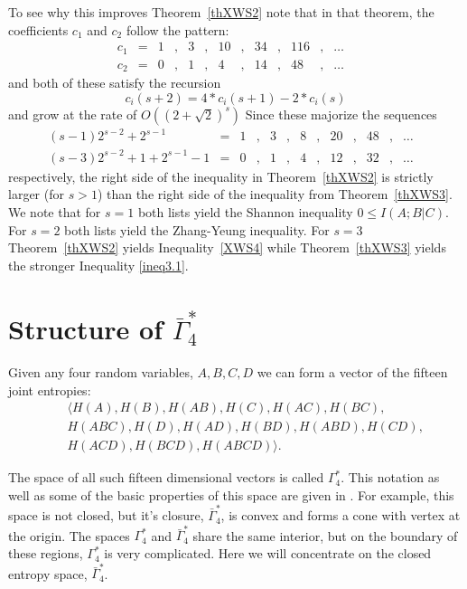 \documentclass[10pt,journal]{IEEEtran}
\begin{document}
To see why this improves Theorem~\ref{thXWS2} note that in that theorem, the coefficients
$c_1$ and $c_2$ follow the pattern:
\begin{align*}
&&c_1&=&1&,&3&,&10&,&34&,&116&,&\ldots&&&\\
&&c_2&=&0&,&1&,&4&,&14&,&48&,&\ldots&&&
\end{align*}
and both of these satisfy the recursion
\begin{equation*}
c_i(s+2) = 4*c_i(s+1) - 2*c_i(s)
\end{equation*}
and grow at the rate of $O((2+\sqrt2)^s)$
Since these majorize the sequences
\begin{align*}
(s-1)2^{s-2} + 2^{s-1}&=&1&,&3&,&8&,&20&,&48&,&\ldots&\\
(s-3)2^{s-2}+1 + 2^{s-1}-1&=&0&,&1&,&4&,&12&,&32&,&\ldots&
\end{align*}
respectively, the right side of the inequality in Theorem~\ref{thXWS2}
is strictly larger (for $s>1$) than the right side of the inequality from Theorem~\ref{thXWS3}.
We note that for $s=1$ both lists yield the Shannon inequality $0\leq I(A;B|C)$.
For $s=2$ both lists yield the Zhang-Yeung inequality.  For $s=3$ Theorem~\ref{thXWS2}
yields Inequality~\eqref{XWS4} while Theorem~\ref{thXWS3} yields the stronger Inequality \eqref{ineq3.1}.




\section{Structure of $\bar\Gamma^*_4$}\label{structure}

Given any four random variables, $A,B,C,D$ we can form a vector of the fifteen joint entropies:
\begin{eqnarray}\label{R15}
\nonumber &&\langle H(A), H(B), H(AB), H(C), H(AC), H(BC),\\
\nonumber && H(ABC),H(D), H(AD), H(BD), H(ABD), H(CD),\\
&& H(ACD), H(BCD), H(ABCD) \rangle.
\end{eqnarray}

The space of all such fifteen dimensional vectors is called $\Gamma^*_4$.
This notation as well as some of the basic properties of this space are given in \cite{Yeung-book}.
For example, this space is not closed, but it's closure, $\bar\Gamma^*_4$, is convex and forms a cone with vertex at the origin.
The spaces $\Gamma^*_4$ and $\bar\Gamma^*_4$ share the same interior, but on the boundary of these regions,
$\Gamma^*_4$ is very complicated.  Here we will concentrate on the closed entropy space, $\bar\Gamma^*_4$.
\end{document}
